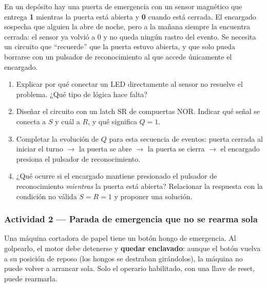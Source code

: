 En un depósito hay una puerta de emergencia con un sensor magnético que entrega \textbf{1} mientras la puerta está abierta y \textbf{0} cuando está cerrada. El encargado sospecha que alguien la abre de noche, pero a la mañana siempre la encuentra cerrada: el sensor ya volvió a 0 y no queda ningún rastro del evento. Se necesita un circuito que ``recuerde'' que la puerta estuvo abierta, y que solo pueda borrarse con un pulsador de reconocimiento al que accede únicamente el encargado.

\begin{enumerate}[label=\alph*)]
    \item Explicar por qué conectar un LED directamente al sensor no resuelve el problema. ¿Qué tipo de lógica hace falta?
    \item Diseñar el circuito con un latch SR de compuertas NOR. Indicar qué señal se conecta a $S$ y cuál a $R$, y qué significa $Q = 1$.
    \item Completar la evolución de $Q$ para esta secuencia de eventos: puerta cerrada al iniciar el turno $\rightarrow$ la puerta se abre $\rightarrow$ la puerta se cierra $\rightarrow$ el encargado presiona el pulsador de reconocimiento.
    \item ¿Qué ocurre si el encargado mantiene presionado el pulsador de reconocimiento \textit{mientras} la puerta está abierta? Relacionar la respuesta con la condición no válida $S = R = 1$ y proponer una solución.
\end{enumerate}

\subsubsection*{Actividad 2 --- Parada de emergencia que no se rearma sola}

Una máquina cortadora de papel tiene un botón hongo de emergencia. Al golpearlo, el motor debe detenerse y \textbf{quedar enclavado}: aunque el botón vuelva a su posición de reposo (los hongos se destraban girándolos), la máquina no puede volver a arrancar sola. Solo el operario habilitado, con una llave de reset, puede rearmarla.

